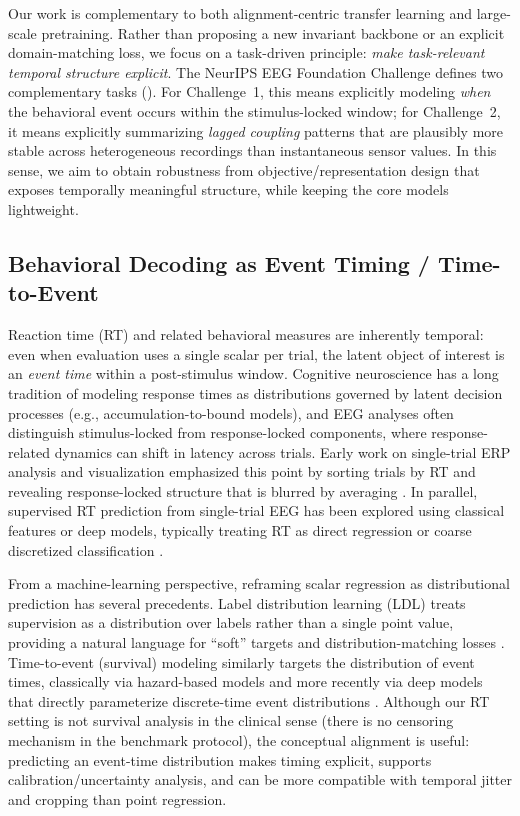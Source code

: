 \documentclass[12pt]{article}
\begin{document}
Our work is complementary to both alignment-centric transfer learning and large-scale pretraining. Rather than proposing
a new invariant backbone or an explicit domain-matching loss, we focus on a task-driven principle: \emph{make
task-relevant temporal structure explicit}. The NeurIPS EEG Foundation Challenge defines two complementary tasks (\citep{EEGChallengeWebsite2025, EEGFoundationChallengeArxiv2025}). For Challenge~1, this means explicitly modeling \emph{when} the behavioral
event occurs within the stimulus-locked window; for Challenge~2, it means explicitly summarizing \emph{lagged coupling}
patterns that are plausibly more stable across heterogeneous recordings than instantaneous sensor values. In this sense,
we aim to obtain robustness from objective/representation design that exposes temporally meaningful structure, while
keeping the core models lightweight.

\subsection{Behavioral Decoding as Event Timing / Time-to-Event}
Reaction time (RT) and related behavioral measures are inherently temporal: even when evaluation uses a single scalar per
trial, the latent object of interest is an \emph{event time} within a post-stimulus window. Cognitive neuroscience has a
long tradition of modeling response times as distributions governed by latent decision processes (e.g., accumulation-to-bound
models), and EEG analyses often distinguish stimulus-locked from response-locked components, where response-related
dynamics can shift in latency across trials. Early work on single-trial ERP analysis and visualization emphasized this
point by sorting trials by RT and revealing response-locked structure that is blurred by averaging \citep{Jung1998SingleTrialERP}.
In parallel, supervised RT prediction from single-trial EEG has been explored using classical features or deep models,
typically treating RT as direct regression or coarse discretized classification \citep{Chowdhury2020RTSensors}.

From a machine-learning perspective, reframing scalar regression as distributional prediction has several precedents.
Label distribution learning (LDL) treats supervision as a distribution over labels rather than a single point value,
providing a natural language for ``soft'' targets and distribution-matching losses \citep{Geng2016LabelDistributionLearning}.
Time-to-event (survival) modeling similarly targets the distribution of event times, classically via hazard-based models
\citep{Cox1972CoxPH} and more recently via deep models that directly parameterize discrete-time event distributions
\citep{Lee2018DeepHit}. Although our RT setting is not survival analysis in the clinical sense (there is no censoring
mechanism in the benchmark protocol), the conceptual alignment is useful: predicting an event-time distribution makes
timing explicit, supports calibration/uncertainty analysis, and can be more compatible with temporal jitter and
cropping than point regression.
\end{document}
